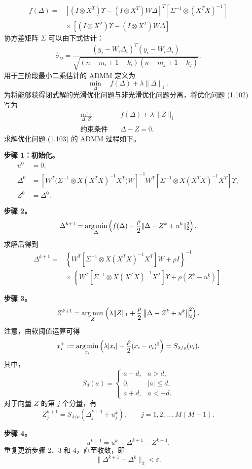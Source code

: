 \[
 \begin{aligned}
 f(\Delta)
 ={}&[(I\otimes X^{T})\Upsilon-(I\otimes X^{T})W\Delta]^{T}
       [\Sigma^{-1}\otimes(X^{T}X)^{-1}]\\
 &{}\times[(I\otimes X^{T})\Upsilon-(I\otimes X^{T})W\Delta].
 \end{aligned}
\]
协方差矩阵 $\Sigma$ 可以由下式估计：
\begin{equation}
 \widehat\sigma_{ij}
 =\frac{(y_i-W_i\Delta_i)^{T}(y_i-W_i\Delta_i)}
        {\sqrt{(n-m_i+1-k_i)(n-m_j+1-k_j)}}.
 \tag{1.101}
\end{equation}
用于三阶段最小二乘估计的 ADMM 定义为
\begin{equation}
 \min_\Delta\quad f(\Delta)+\lambda\lVert\Delta\rVert_1.
 \tag{1.102}
\end{equation}
为将能够获得闭式解的光滑优化问题与非光滑优化问题分离，将优化问题 (1.102) 写为
\begin{equation}
 \begin{aligned}
 \min_{\Delta,Z}\quad&f(\Delta)+\lambda\lVert Z\rVert_1\\
 \text{约束条件}\quad&\Delta-Z=0.
 \end{aligned}
 \tag{1.103}
\end{equation}
求解优化问题 (1.103) 的 ADMM 过程如下。

\noindent\textbf{步骤 1：初始化。}
\[
 \begin{aligned}
 u^0&=0,\\
 \Delta^0&=
 \left[W^{T}\bigl(\Sigma^{-1}\otimes X(X^{T}X)^{-1}X^{T}\bigr)W\right]^{-1}
 W^{T}[\Sigma^{-1}\otimes X(X^{T}X)^{-1}X^{T}]\Upsilon,\\
 Z^0&=\Delta^0.
 \end{aligned}
\]

\noindent\textbf{步骤 2。}
\[
 \Delta^{k+1}=\operatorname*{arg\,min}_\Delta
 \left(f(\Delta)+\frac\rho2\lVert\Delta-Z^k+u^k\rVert_2^2\right).
\]
求解后得到
\[
 \begin{aligned}
 \Delta^{k+1}
 ={}&\left\{W^{T}[\Sigma^{-1}\otimes X(X^{T}X)^{-1}X^{T}]W+\rho I\right\}^{-1}\\
 &{}\times\left\{
 W^{T}[\Sigma^{-1}\otimes X(X^{T}X)^{-1}X^{T}]\Upsilon
       +\rho\left(Z^k-u^k\right)\right].
 \end{aligned}
\]

\noindent\textbf{步骤 3。}
\[
 Z^{k+1}=\operatorname*{arg\,min}_Z
 \left(\lambda\lVert Z\rVert_1
       +\frac\rho2\left\lVert\Delta-Z^k+u^k\right\rVert_2^2\right).
\]
注意，由软阈值运算可得
\[
 x_i^+:=\operatorname*{arg\,min}_{x_i}
 \left(\lambda|x_i|+\frac\rho2(x_i-v_i)^2\right)
 =S_{\lambda/\rho}(v_i),
\]
其中，
\[
 S_d(a)=
 \begin{cases}
  a-d,&a>d,\\
  0,&|a|\leq d,\\
  a+d,&a<-d.
 \end{cases}
\]
对于向量 $Z$ 的第 $j$ 个分量，有
\[
 Z_j^{k+1}=S_{\lambda/\rho}
 \left(\Delta_j^{k+1}+u_j^k\right),
 \qquad j=1,2,\ldots,M(M-1).
\]

\noindent\textbf{步骤 4。}
\[
 u^{k+1}=u^k+\Delta^{k+1}-Z^{k+1}.
\]
重复更新步骤 2、3 和 4，直至收敛，即
\[
 \lVert\Delta^{k+1}-\Delta^k\rVert_2<\varepsilon.
\]
